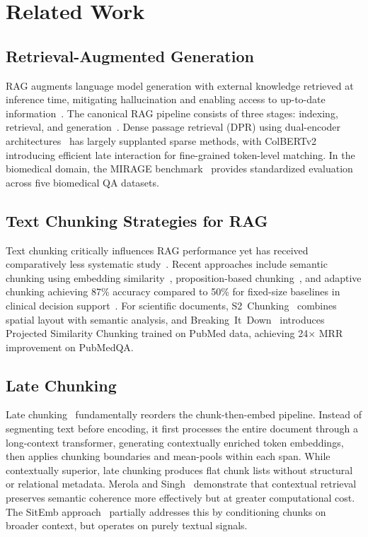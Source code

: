 \documentclass[sn-basic]{sn-jnl}
\begin{document}
\section{Related Work}\label{sec:related}

\subsection{Retrieval-Augmented Generation}

RAG augments language model generation with external knowledge retrieved at inference time, mitigating hallucination and enabling access to up-to-date information~\cite{lewis2020retrieval}. The canonical RAG pipeline consists of three stages: indexing, retrieval, and generation~\cite{gao2024retrieval}. Dense passage retrieval (DPR) using dual-encoder architectures~\cite{karpukhin2020dense} has largely supplanted sparse methods, with ColBERTv2~\cite{santhanam2022colbertv2} introducing efficient late interaction for fine-grained token-level matching. In the biomedical domain, the MIRAGE benchmark~\cite{xiong2024benchmarking} provides standardized evaluation across five biomedical QA datasets.

\subsection{Text Chunking Strategies for RAG}

Text chunking critically influences RAG performance yet has received comparatively less systematic study~\cite{zhao2025moc}. Recent approaches include semantic chunking using embedding similarity~\cite{zhao2025moc}, proposition-based chunking~\cite{chen2023dense}, and adaptive chunking achieving 87\% accuracy compared to 50\% for fixed-size baselines in clinical decision support~\cite{maina2025comparative}. For scientific documents, S2~Chunking~\cite{verma2025s2} combines spatial layout with semantic analysis, and Breaking~It~Down~\cite{allamraju2025breaking} introduces Projected Similarity Chunking trained on PubMed data, achieving 24$\times$ MRR improvement on PubMedQA.

\subsection{Late Chunking}

Late chunking~\cite{gunther2024late} fundamentally reorders the chunk-then-embed pipeline. Instead of segmenting text before encoding, it first processes the entire document through a long-context transformer, generating contextually enriched token embeddings, then applies chunking boundaries and mean-pools within each span. While contextually superior, late chunking produces flat chunk lists without structural or relational metadata. Merola and Singh~\cite{merola2025reconstructing} demonstrate that contextual retrieval preserves semantic coherence more effectively but at greater computational cost. The SitEmb approach~\cite{wu2025sitemb} partially addresses this by conditioning chunks on broader context, but operates on purely textual signals.
\end{document}
